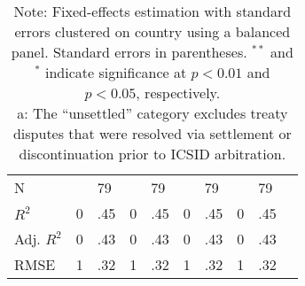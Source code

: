 \documentclass[12pt,onesided]{amsart}
\begin{document}
\begin{table}[ht]
\begin{tabular}{lr@{} lr@{}lr@{}lr@{}lr@{}}
  N && 79 && 79 && 79 && 79 \\ 
  $R^{2}$ & 0&.45 & 0&.45 & 0&.45 & 0&.45 \\ 
  Adj. $R^{2}$ & 0&.43 & 0&.43 & 0&.43 & 0&.43 \\ 
  RMSE & 1&.32 & 1&.32 & 1&.32 & 1&.32 \\ 
   \hline
\hline
\end{tabular}
\caption*{Note: Fixed-effects estimation with standard errors clustered on country using a balanced panel. Standard errors in parentheses. $^{**}$ and $^{*}$ indicate significance at $p<0.01$ and $p<0.05$, respectively. \\ a: The ``unsettled'' category excludes treaty disputes that were resolved via settlement or discontinuation prior to ICSID arbitration.}
\end{table}

\newpage

\end{document}

